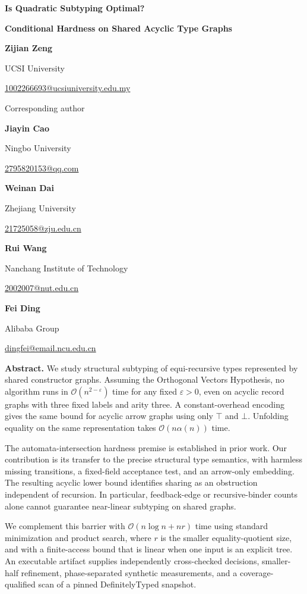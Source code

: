 \documentclass[11pt,letterpaper]{article}
\theoremstyle{definition}\newtheorem{definition}[theorem]{Definition}
\newcommand{\Oh}{\mathcal O}
\begin{document}
\begin{titlepage}
\centering
{\LARGE\bfseries Is Quadratic Subtyping Optimal?\par}
\medskip
{\Large\bfseries Conditional Hardness on Shared Acyclic Type Graphs\par}
\bigskip
{\large\bfseries Zijian Zeng}\par
UCSI University\par
\href{mailto:1002266693@ucsiuniversity.edu.my}{1002266693@ucsiuniversity.edu.my}\par
Corresponding author\par\medskip
{\large\bfseries Jiayin Cao}\par
Ningbo University\par
\href{mailto:2795820153@qq.com}{2795820153@qq.com}\par\medskip
{\large\bfseries Weinan Dai}\par
Zhejiang University\par
\href{mailto:21725058@zju.edu.cn}{21725058@zju.edu.cn}\par\medskip
{\large\bfseries Rui Wang}\par
Nanchang Institute of Technology\par
\href{mailto:2002007@nut.edu.cn}{2002007@nut.edu.cn}\par\medskip
{\large\bfseries Fei Ding}\par
Alibaba Group\par
\href{mailto:dingfei@email.ncu.edu.cn}{dingfei@email.ncu.edu.cn}\par
\bigskip
\begin{minipage}{\textwidth}
\noindent\textbf{Abstract.}
We study structural subtyping of equi-recursive types represented by shared constructor graphs. Assuming the Orthogonal Vectors Hypothesis, no algorithm runs in $\Oh(n^{2-\varepsilon})$ time for any fixed $\varepsilon>0$, even on acyclic record graphs with three fixed labels and arity three. A constant-overhead encoding gives the same bound for acyclic arrow graphs using only $\top$ and $\bot$. Unfolding equality on the same representation takes $\Oh(n\alpha(n))$ time.

The automata-intersection hardness premise is established in prior work. Our contribution is its transfer to the precise structural type semantics, with harmless missing transitions, a fixed-field acceptance test, and an arrow-only embedding. The resulting acyclic lower bound identifies sharing as an obstruction independent of recursion. In particular, feedback-edge or recursive-binder counts alone cannot guarantee near-linear subtyping on shared graphs.

We complement this barrier with $\Oh(n\log n+nr)$ time using standard minimization and product search, where $r$ is the smaller equality-quotient size, and with a finite-access bound that is linear when one input is an explicit tree. An executable artifact supplies independently cross-checked decisions, smaller-half refinement, phase-separated synthetic measurements, and a coverage-qualified scan of a pinned DefinitelyTyped snapshot.
\end{minipage}
\end{titlepage}
\setcounter{page}{1}
\pagestyle{plain}
\end{document}
